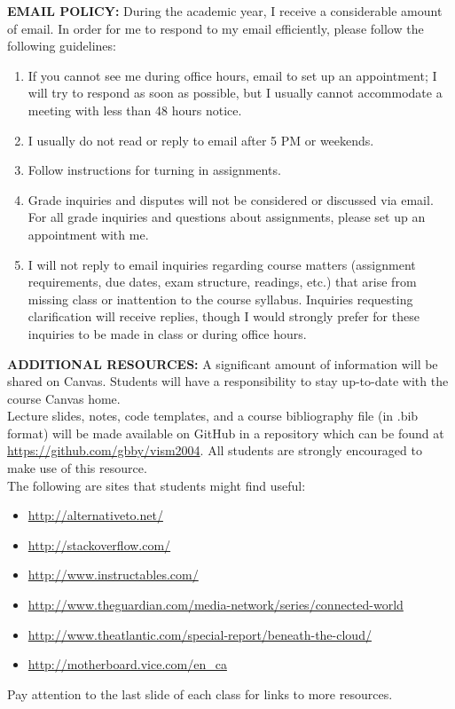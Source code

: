 \documentclass[10pt]{article}
\begin{document}
\textbf{EMAIL POLICY:} 
During the academic year, I receive a considerable amount of email. In order for me to respond to my email efficiently, please follow the following guidelines:
\begin{enumerate}
	\item If you cannot see me during office hours, email to set up an appointment; I will try to respond as soon as possible, but I usually cannot accommodate a meeting with less than 48 hours notice.
	\item I usually do not read or reply to email after 5 PM or weekends. 
	\item Follow instructions for turning in assignments. 
	\item Grade inquiries and disputes will not be considered or discussed via email. For all grade inquiries and questions about assignments, please set up an appointment with me. 
	\item I will not reply to email inquiries regarding course matters (assignment requirements, due dates, exam structure, readings, etc.) that arise from missing class or inattention to the course syllabus. Inquiries requesting clarification will receive replies, though I would strongly prefer for these inquiries to be made in class or during office hours.
\end{enumerate}

\textbf{ADDITIONAL RESOURCES:}
A significant amount of information will be shared on Canvas. Students will have a responsibility to stay up-to-date with the course Canvas home.\\ 
Lecture slides, notes, code templates, and a course bibliography file (in .bib format) will be made available on GitHub in a repository which can be found at \url{https://github.com/gbby/vism2004}. All students are strongly encouraged to make use of this resource.\\
The following are sites that students might find useful:
 \begin{itemize}[noitemsep,nolistsep]
 	\item \url{http://alternativeto.net/}
 	\item \url{http://stackoverflow.com/}
 	\item \url{http://www.instructables.com/}
 	\item \url{http://www.theguardian.com/media-network/series/connected-world}
 	\item \url{http://www.theatlantic.com/special-report/beneath-the-cloud/}
 	\item \url{http://motherboard.vice.com/en_ca}
 \end{itemize}
Pay attention to the last slide of each class for links to more resources. 
\end{document}
